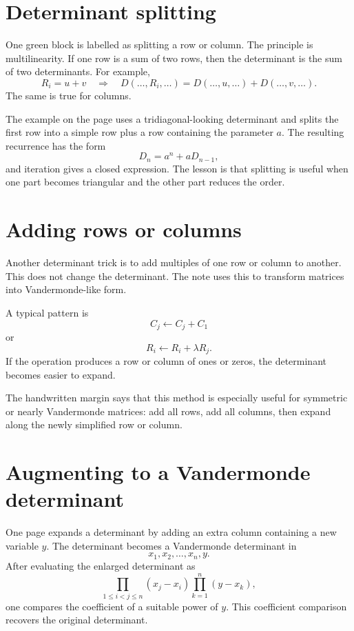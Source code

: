 \section{Determinant splitting}

One green block is labelled as splitting a row or column.  The principle is multilinearity.  If one row is a sum of two rows, then the determinant is the sum of two determinants.  For example,
\[
  R_i=u+v
  \quad\Longrightarrow\quad
  D(\ldots,R_i,\ldots)=D(\ldots,u,\ldots)+D(\ldots,v,\ldots).
\]
The same is true for columns.

The example on the page uses a tridiagonal-looking determinant and splits the first row into a simple row plus a row containing the parameter $a$.  The resulting recurrence has the form
\[
  D_n=a^n+aD_{n-1},
\]
and iteration gives a closed expression.  The lesson is that splitting is useful when one part becomes triangular and the other part reduces the order.

\section{Adding rows or columns}

Another determinant trick is to add multiples of one row or column to another.  This does not change the determinant.  The note uses this to transform matrices into Vandermonde-like form.

A typical pattern is
\[
  C_j\leftarrow C_j+C_1
\]
or
\[
  R_i\leftarrow R_i+\lambda R_j.
\]
If the operation produces a row or column of ones or zeros, the determinant becomes easier to expand.

The handwritten margin says that this method is especially useful for symmetric or nearly Vandermonde matrices: add all rows, add all columns, then expand along the newly simplified row or column.

\section{Augmenting to a Vandermonde determinant}

One page expands a determinant by adding an extra column containing a new variable $y$.  The determinant becomes a Vandermonde determinant in
\[
  x_1,x_2,\ldots,x_n,y.
\]
After evaluating the enlarged determinant as
\[
  \prod_{1\le i<j\le n}(x_j-x_i)\prod_{k=1}^n(y-x_k),
\]
one compares the coefficient of a suitable power of $y$.  This coefficient comparison recovers the original determinant.

